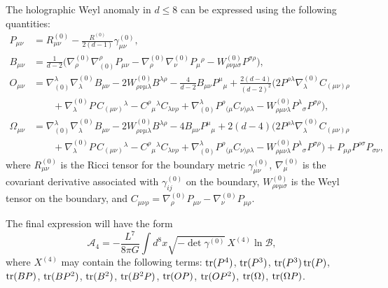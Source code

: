 The holographic Weyl anomaly in $d\leqslant8$ can be expressed using the following quantities:
\begin{align}
P_{\mu\nu}&=R^{(0)}_{\mu\nu}-\frac{R^{(0)}}{2(d-1)}\gamma^{(0)}_{\mu\nu},\label{eq:2}\\
B_{\mu\nu}&=\frac{1}{d-2}\Big(\nabla^{(0)}_\rho\nabla^\rho_{(0)}P_{\mu\nu}-\nabla^{(0)}_\rho\nabla^{(0)}_\nu P_\mu{}^\rho-W^{(0)}_{\rho\nu\mu\sigma}P^{\sigma\rho}\Big),\label{eq:3}\\
O_{\mu\nu}&=\nabla^\lambda_{(0)}\nabla^{(0)}_\lambda B_{\mu\nu}-2W^{(0)}_{\rho\nu\mu\lambda}B^{\lambda\rho}-\frac{4}{d-2}B_{\mu\nu}P^\mu{}_\mu+\frac{2(d-4)}{(d-2)^2}\Big(2P^{\rho\lambda}\nabla^{(0)}_\lambda C_{(\mu\nu)\rho}\nonumber\\
&\qquad+\nabla^{(0)}_\lambda P\,C_{(\mu\nu)}{}^\lambda-C^\rho{}_\mu{}^\lambda C_{\lambda\nu\rho}+\nabla^\lambda_{(0)}P^\rho{}_{(\mu}C_{\nu)\rho\lambda}-W^{(0)}_{\rho\mu\nu\lambda}P^\lambda{}_\sigma P^{\sigma\rho}\Big),\label{eq:4}\\
\Omega_{\mu\nu}&=\nabla^\lambda_{(0)}\nabla^{(0)}_\lambda B_{\mu\nu}-2W^{(0)}_{\rho\nu\mu\lambda}B^{\lambda\rho}-4B_{\mu\nu}P^\mu{}_\mu+2(d-4)\Big(2P^{\rho\lambda}\nabla^{(0)}_\lambda C_{(\mu\nu)\rho}\nonumber\\
&\qquad+\nabla^{(0)}_\lambda P\,C_{(\mu\nu)}{}^\lambda-C^\rho{}_\mu{}^\lambda C_{\lambda\nu\rho}+\nabla^\lambda_{(0)}P^\rho{}_{(\mu}C_{\nu)\rho\lambda}-W^{(0)}_{\rho\mu\nu\lambda}P^\lambda{}_\sigma P^{\sigma\rho}\Big)+P_{\mu\rho}P^{\rho\sigma}P_{\sigma\nu},\label{eq:6}
\end{align}
where $R^{(0)}_{\mu\nu}$ is the Ricci tensor for the boundary metric $\gamma^{(0)}_{\mu\nu}$, $\nabla^{(0)}_\mu$ is the covariant derivative associated with $\gamma^{(0)}_{ij}$ on the boundary, $W^{(0)}_{\rho\nu\mu\sigma}$ is the Weyl tensor on the boundary, and $C_{\mu\nu\rho}=\nabla^{(0)}_\rho P_{\mu\nu}-\nabla^{(0)}_\nu P_{\mu\rho}$. 

The final expression will have the form
\begin{equation}
\mathcal A_4=-\frac{L^7}{8\pi G}\int d^8x\sqrt{-\det\gamma^{(0)}}\,X^{(4)}\ln\mathcal B,
\label{eq:8}
\end{equation}
where $X^{(4)}$ may contain the following terms: $\operatorname{tr}(P^4)$, $\operatorname{tr}(P^3)$, $\operatorname{tr}(P^3)\operatorname{tr}(P)$, $\operatorname{tr}(BP)$, $\operatorname{tr}(BP^2)$, $\operatorname{tr}(B^2)$, $\operatorname{tr}(B^2P)$, $\operatorname{tr}(OP)$, $\operatorname{tr}(OP^2)$, $\operatorname{tr}(\Omega)$, $\operatorname{tr}(\Omega P)$.


